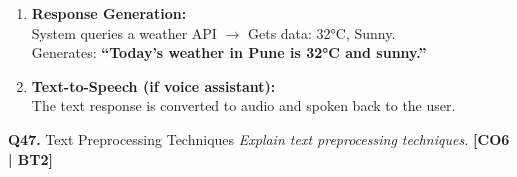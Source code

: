 \documentclass[12pt,a4paper]{article}
\newcommand{\Qno}[1]{\textbf{\color{darkred}Q#1.}}
\newcommand{\term}[1]{\textbf{\color{headingcolor}#1}}
\begin{document}
\begin{answerenv}
\begin{enumerate}[leftmargin=1.8em, itemsep=5pt]
  \item \term{Response Generation:}\\
  System queries a weather API $\to$ Gets data: 32°C, Sunny.\\
  Generates: \textbf{``Today's weather in Pune is 32°C and sunny.''}

  \item \term{Text-to-Speech (if voice assistant):}\\
  The text response is converted to audio and spoken back to the user.
\end{enumerate}

\end{answerenv}

\vspace{8pt}

\begin{questionbox}{\Qno{47} Text Preprocessing Techniques}
\textit{Explain text preprocessing techniques.} \hfill \textbf{[CO6 | BT2]}
\end{questionbox}
\end{document}
